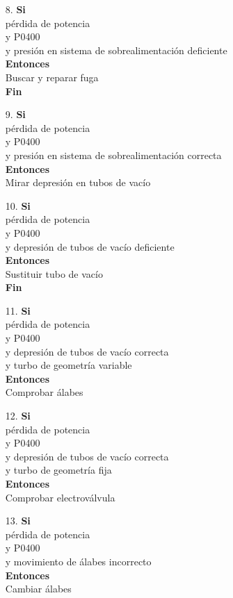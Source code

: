 \documentclass[a4paper,12pt]{article}
\newcommand\tab[1][1cm]{\hspace*{#1}}
\begin{document}
\begin{itemize}
\item[8.]\textbf{Si}\\ \tab pérdida de potencia\\ \tab y P0400\\ \tab y presión en sistema de sobrealimentación deficiente\\ \textbf{Entonces}\\ \tab Buscar y reparar fuga\\ \tab \textbf{Fin}
\item[9.]\textbf{Si}\\ \tab pérdida de potencia\\ \tab y P0400\\ \tab y presión en sistema de sobrealimentación correcta\\ \textbf{Entonces}\\ \tab Mirar depresión en tubos de vacío
\item[10.]\textbf{Si}\\ \tab pérdida de potencia\\ \tab y P0400\\ \tab y depresión de tubos de vacío deficiente\\ \textbf{Entonces}\\ \tab Sustituir tubo de vacío\\ \tab \textbf{Fin}
\item[11.]\textbf{Si}\\ \tab pérdida de potencia\\ \tab y P0400\\ \tab y depresión de tubos de vacío correcta\\ \tab y turbo de geometría variable\\ \textbf{Entonces}\\ \tab Comprobar álabes
\item[12.]\textbf{Si}\\ \tab pérdida de potencia\\ \tab y P0400\\ \tab y depresión de tubos de vacío correcta\\ \tab y turbo de geometría fija\\ \textbf{Entonces}\\ \tab Comprobar electroválvula
\item[13.]\textbf{Si}\\ \tab pérdida de potencia\\ \tab y P0400\\ \tab y movimiento de álabes incorrecto\\ \textbf{Entonces}\\ \tab Cambiar álabes

\end{itemize}
\end{document}
